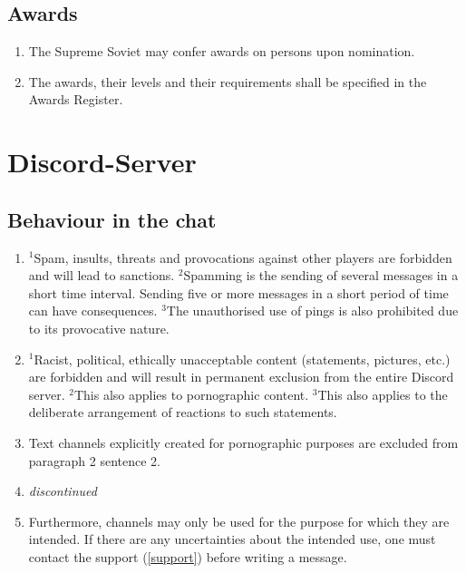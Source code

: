 \documentclass{article}
\begin{document}
\subsection{Awards}
\begin{enumerate}[(1)]
    \item The Supreme Soviet may confer awards on persons upon nomination.
    \item The awards, their levels and their requirements shall be specified in the Awards Register.
\end{enumerate}

\section{Discord-Server}
\subsection{Behaviour in the chat}\label{verhalten}
\begin{enumerate}[(1)]
	\item $^{1}$Spam, insults, threats and provocations against other players are forbidden and will lead to sanctions. $^{2}$Spamming is the sending of several messages in a short time interval. Sending five or more messages in a short period of time can have consequences. $^{3}$The unauthorised use of pings is also prohibited due to its provocative nature.
	\item $^{1}$Racist, political, ethically unacceptable content (statements, pictures, etc.) are forbidden and will result in permanent exclusion from the entire Discord server. $^{2}$This also applies to pornographic content. $^{3}$This also applies to the deliberate arrangement of reactions to such statements.
	\item Text channels explicitly created for pornographic purposes are excluded from paragraph 2 sentence 2.
	\item \textit{discontinued}
	\item Furthermore, channels may only be used for the purpose for which they are intended. If there are any uncertainties about the intended use, one must contact the support (\ref{support}) before writing a message.
\end{enumerate}
\end{document}
